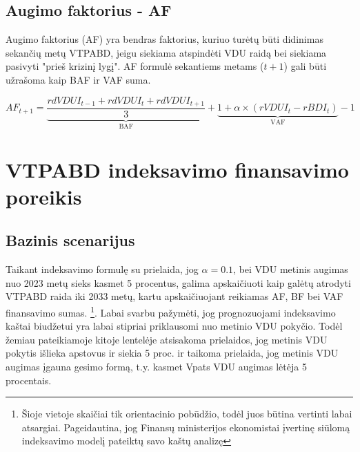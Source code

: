 \documentclass[titlepage, 11pt]{article}
\begin{document}
\newpage

\subsection{Augimo faktorius - AF}
Augimo faktorius (AF) yra bendras faktorius, kuriuo turėtų būti didinimas sekančių metų VTPABD, jeigu siekiama atspindėti VDU raidą bei siekiama pasivyti "prieš krizinį lygį". AF formulė sekantiems metams ($t+1$) gali būti užrašoma kaip BAF ir VAF suma.

\begin{equation}
AF_{t+1}=
\underbrace{
\frac{rdVDUI_{t-1}+rdVDUI_{t}+rdVDUI_{t+1}}{3}
}_\text{BAF}
+ 
\underbrace{1+ \alpha \times	(rVDUI_{t}-rBDI_{t})
}_\text{VAF}
-1
\end{equation}

\section{VTPABD indeksavimo finansavimo poreikis}

\subsection{Bazinis scenarijus}

Taikant indeksavimo formulę su prielaida, jog $\alpha=0.1$, bei VDU metinis augimas nuo 2023 metų sieks kasmet 5 procentus, galima apskaičiuoti kaip galėtų atrodyti VTPABD raida iki 2033 metų, kartu apskaičiuojant reikiamas AF, BF bei VAF finansavimo sumas. \footnote{Šioje vietoje skaičiai tik orientacinio pobūdžio, todėl juos būtina vertinti labai atsargiai. Pageidautina, jog Finansų ministerijos ekonomistai įvertinę siūlomą indeksavimo modelį pateiktų savo kaštų analizę}. Labai svarbu pažymėti, jog prognozuojami indeksavimo kaštai biudžetui yra labai stipriai priklausomi nuo metinio VDU pokyčio. Todėl žemiau pateikiamoje kitoje lentelėje atsisakoma prielaidos, jog metinis VDU pokytis išlieka apstovus ir siekia 5 proc. ir taikoma prielaida, jog metinis VDU augimas įgauna gesimo formą, t.y. kasmet Vpats VDU augimas lėtėja 5 procentais.
\end{document}
